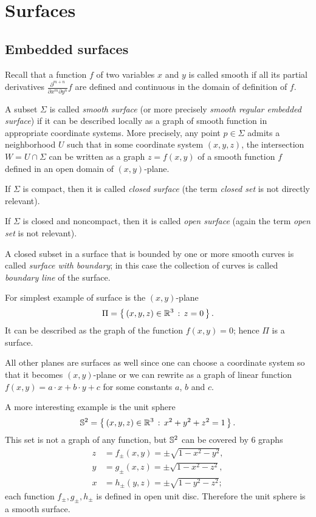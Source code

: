 \chapter{Surfaces}

\section{Embedded surfaces}

Recall that a function $f$ of two variables $x$ and $y$ is called smooth if all its partial derivatives $\frac{\partial^{m+n}}{\partial x^m\partial y^n}f$ are defined and continuous in the domain of definition of $f$. 

A subset $\Sigma$ is called \emph{smooth surface} (or more precisely \emph{smooth regular embedded surface}) if it can be described locally as a graph of smooth function in appropriate coordinate systems.
More precisely, any point $p\in \Sigma$ admits a neighborhood $U$ such that
in some coordinate system $(x,y,z)$, 
the intersection $W=U\cap \Sigma$ can be written as a graph $z=f(x,y)$ of a smooth function $f$ defined in an open domain of $(x,y)$-plane.

If $\Sigma$ is compact, then it is called \emph{closed surface} (the term \emph{closed set} is not directly relevant).

If $\Sigma$ is closed and noncompact, then it is called  \emph{open surface} (again the term \emph{open set} is not relevant).

A closed subset in a surface that is bounded by one or more smooth curves is called \emph{surface with boundary}; in this case the collection of curves is called \emph{boundary line} of the surface.

For simplest example of surface is the $(x,y)$-plane 
\[\Pi=\left\{\,{(x,y,z)\in\mathbb{R}^3}\,:\,{z=0}\,\right\}.\]
It can be described as the graph of the function $f(x,y)=0$; hence $\Pi$ is a surface.

All other planes are surfaces as well since one can choose a coordinate system so that it becomes $(x,y)$-plane or we can rewrite as a graph of linear function 
$f(x,y)=a\cdot x+b\cdot y+c$ for some constants $a$, $b$ and $c$.

A more interesting example is the unit sphere 
\[\mathbb{S}^2=\left\{\,{(x,y,z)\in\mathbb{R}^3}\,:\,{x^2+y^2+z^2=1}\,\right\}.\]
This set is not a graph of any function,
but $\mathbb{S}^2$
can be covered by 6 graphs 
\begin{align*}
z&=f_\pm(x,y)=\pm \sqrt{1-x^2-y^2},
\\
y&=g_\pm(x,z)=\pm \sqrt{1-x^2-z^2},
\\
x&=h_\pm(y,z)=\pm \sqrt{1-y^2-z^2};
\end{align*}
each function $f_\pm,g_\pm,h_\pm$ is defined in open unit disc.
Therefore the unit sphere is a smooth surface.

